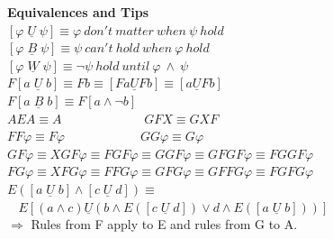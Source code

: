 \documentclass{article}
\begin{document}
\begin{multicols}{4}
\textbf{Equivalences and Tips} \\
$[\varphi\; \underline{U}\; \psi] \equiv \varphi\ don't\ matter\ when\ \psi\ hold $ \\
$[\varphi \;\underline{B}\; \psi] \equiv \psi\ can't\ hold\ when\ \varphi\ hold $ \\
$[\varphi \;\underline{W}\; \psi] \equiv \neg\psi\ hold\ until\ \varphi\ \wedge\ \psi $ \\
$F[a \;\underline{U}\; b] \equiv Fb \equiv [Fa \underline{U} Fb] \equiv [a \underline{U} Fb] $ \\
$F[a \;\underline{B}\; b] \equiv F[a \wedge \neg b] $ \\
$AEA \equiv A\qquad\qquad\qquad\;\; GFX \equiv GXF $ \\
$FF\varphi \equiv F\varphi \qquad\qquad\qquad GG\varphi \equiv G\varphi$\\
$GF\varphi \equiv XGF\varphi\equiv FGF\varphi \equiv GGF\varphi\equiv GFGF\varphi \equiv FGGF\varphi$\\
$FG\varphi\equiv XFG\varphi \equiv FFG\varphi \equiv GFG\varphi \equiv GFFG\varphi \equiv FGFG\varphi$ \\
$E([a \;\underline{U}\; b] \wedge [c \;\underline{U}\; d]) \equiv $ \\
$\ \ \ \ E[(a \wedge c) \underline{U} (b \wedge E([c\; \underline{U}\; d]) \vee d \wedge E([a\; \underline{U}\; b]))] $ \\
$\Rightarrow$ Rules from F apply to E and rules from G to A.\\


\end{multicols}
\end{document}
